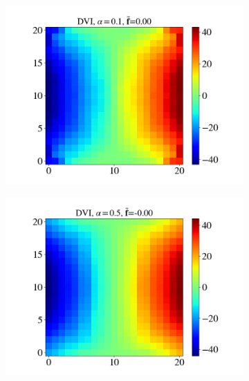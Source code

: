 \begin{itemize}
\begin{figure}[H]
\begin{subfigure}{0.32\columnwidth}
			\includegraphics[width=1.0\textwidth]{images/CD/Example7/20/T2_21_DVI_0.1.png}
		\end{subfigure}
		\begin{subfigure}{0.32\columnwidth}	
			\centering
			\includegraphics[width=1.0\textwidth]{images/CD/Example7/20/T2_21_DVI_0.5.png}
		\end{subfigure}
		\begin{subfigure}{0.32\columnwidth}	
			\centering

\end{subfigure}
\end{figure}
\end{itemize}
